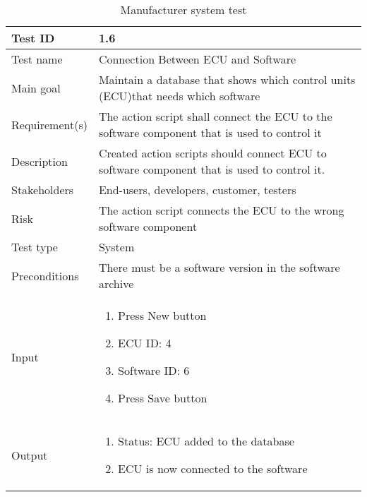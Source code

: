 \begin{table}[H]
\centering
\caption{Manufacturer system test}
\begin{tabularx}{1.0\textwidth}{
    |p{}     %
    |p{}|    %
}
\hline

Test ID
& 1.6
\\
\hline

Test name
& Connection Between ECU and Software
\\
\hline

Main goal
& Maintain a database that shows which control units (ECU)that needs which software
\\
\hline

Requirement(s)
& The action script shall connect the ECU to the software component that is used to control it
\\
\hline

Description
& Created action scripts should connect ECU to software component that is used to control it.
\\
\hline

Stakeholders
& End-users, developers, customer, testers
\\
\hline

Risk
& The action script connects the ECU to the wrong software component
\\
\hline

Test type
& System
\\
\hline

Preconditions
& There must be a software version in the software archive
\\
\hline

Input
& \begin{enumerate}
    \item Press New button
    \item ECU ID: 4
    \item Software ID: 6
    \item Press Save button
\end{enumerate}
\\
\hline

Output
& \begin{enumerate}
    \item Status: ECU added to the database
    \item ECU is now connected to the software
\end{enumerate}
\\
\hline


\end{tabularx}
\end{table}
